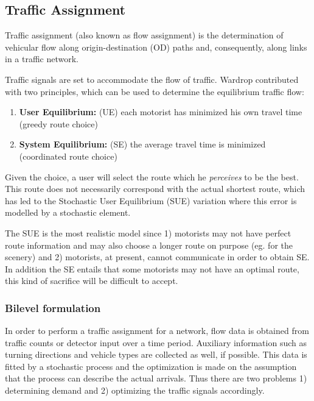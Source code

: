 \subsection{Traffic Assignment}
\label{sec:usereq}

Traffic assignment (also known as flow assignment) is the
determination of vehicular flow along origin-destination (OD) paths
and, consequently, along links in a traffic network.

Traffic signals are set to accommodate the flow of traffic. Wardrop
contributed with two principles, which can be used to determine the
equilibrium traffic flow:

\begin{enumerate}
\item \textbf{User Equilibrium:} (UE) each motorist has minimized his own travel time (greedy route choice)
\item \textbf{System Equilibrium:} (SE) the average travel time is minimized (coordinated route choice)
\end{enumerate}

Given the choice, a user will select the route which he
\textit{perceives} to be the best. This route does not necessarily
correspond with the actual shortest route, which has led to the
Stochastic User Equilibrium (SUE) variation \citet{32} where this error
is modelled by a stochastic element.

The SUE is the most realistic model since 1) motorists may not have
perfect route information and may also choose a longer route on
purpose (eg. for the scenery) and 2) motorists, at present, cannot
communicate in order to obtain SE. In addition the SE entails that
some motorists may not have an optimal route, this kind of sacrifice
will be difficult to accept.

\subsubsection*{Bilevel formulation}
\label{sec:bilevel}

In order to perform a traffic assignment for a network, flow data is
obtained from traffic counts or detector input over a time
period. Auxiliary information such as turning directions and vehicle
types are collected as well, if possible. This data is fitted by a
stochastic process and the optimization is made on the assumption that
the process can describe the actual arrivals. Thus there are two
problems 1) determining demand and 2) optimizing the traffic signals
accordingly.

